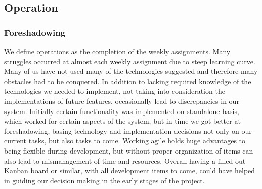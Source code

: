 \documentclass{article}
\begin{document}
\subsection{Operation}
    \subsubsection{Foreshadowing}
    We define operations as the completion of the weekly assignments. Many struggles occurred at almost each weekly assignment due to steep learning curve. Many of us have not used many of the technologies suggested and therefore many obstacles had to be conquered.
    In addition to lacking required knowledge of the technologies we needed to implement, not taking into consideration the implementations of future features, occasionally lead to discrepancies in our system. Initially certain functionality was implemented on standalone basis, which worked for certain aspects of the system, but in time we got better at foreshadowing, basing technology and implementation decisions not only on our current tasks, but also tasks to come. Working agile holds huge advantages to being flexible during development, but without proper organization of items can also lead to mismanagement of time and resources. Overall having a filled out Kanban board or similar, with all development items to come, could have helped in guiding our decision making in the early stages of the project.
\end{document}
